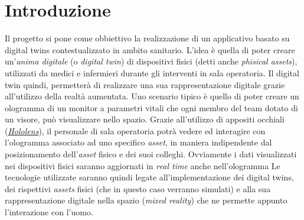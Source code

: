 \chapter{Introduzione}
Il progetto si pone come obbiettivo la realizzazione di un applicativo basato su digital twins contestualizzato in ambito sanitario. L'idea è quella di poter creare un'\textit{anima digitale} (o \textit{digital twin}) di dispositivi fisici (detti anche \textit{phisical assets}), utilizzati da medici e infermieri durante gli interventi in sala operatoria. Il digital twin quindi, permetterà di realizzare una sua rappresentazione digitale grazie all'utilizzo della realtà aumentata. \newline \newline Uno scenario tipico è quello di poter creare un ologramma di un monitor a parametri vitali che ogni membro del team dotato di un visore, può visualizzare nello spazio. Grazie all'utilizzo di appositi occhiali (\href{https://www.microsoft.com/it-it/hololens}{\textit{Hololens}}), il personale di sala operatoria potrà vedere ed interagire con l'ologramma associato ad uno specifico \textit{asset}, in maniera indipendente dal posizionamento dell'\textit{asset} fisico e dei suoi colleghi. Ovviamente i dati visualizzati nei dispositivi fisici saranno aggiornati in \textit{real time} anche nell'ologramma
\newline \newline Le tecnologie utilizzate saranno quindi legate all'implementazione dei digital twins, dei rispettivi \textit{assets} fisici (che in questo caso verranno simulati) e alla sua rappresentazione digitale nella spazio (\textit{mixed reality}) che ne permette appunto l'interazione con l'uomo.
